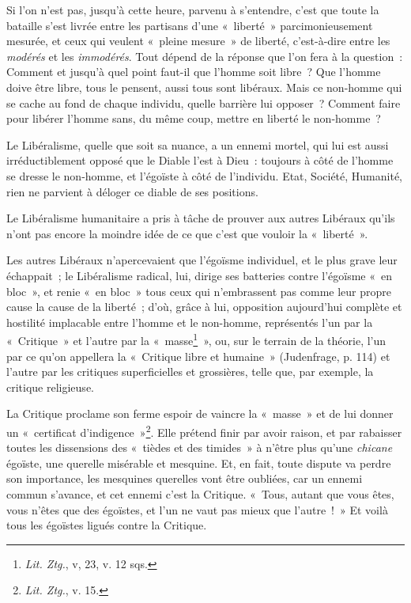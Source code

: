 \documentclass[french,twoside]{book} %
\begin{document}
\noindent Si l’on n’est pas, jusqu’à cette heure, parvenu à s’entendre, c’est que toute la bataille s’est livrée entre les partisans d’une « liberté » parcimonieusement mesurée, et ceux qui veulent « pleine mesure » de liberté, c’est-à-dire entre les \emph{modérés} et les \emph{immodérés}. Tout dépend de la réponse que l’on fera à la question : Comment et jusqu’à quel point faut-il que l’homme soit libre ? Que l’homme doive être libre, tous le pensent, aussi tous sont libéraux. Mais ce non-homme qui se cache au fond de chaque individu, quelle barrière lui opposer ? Comment faire pour libérer l’homme sans, du même coup, mettre en liberté le non-homme ?\par
Le Libéralisme, quelle que soit sa nuance, a un ennemi mortel, qui lui est aussi irréductiblement opposé que le Diable l’est à Dieu : toujours à côté de l’homme se dresse le non-homme, et l’égoïste à côté de l’individu. Etat, Société, Humanité, rien ne parvient à déloger ce diable de ses positions.\par
Le Libéralisme humanitaire a pris à tâche de prouver aux autres Libéraux qu’ils n’ont pas encore la moindre idée de ce que c’est que vouloir la « liberté ».\par
Les autres Libéraux n’apercevaient que l’égoïsme individuel, et le plus grave leur échappait ; le Libéralisme radical, lui, dirige ses batteries contre l’égoïsme « en bloc », et renie « en bloc » tous ceux qui n’embrassent pas comme leur propre cause la cause de la liberté ; d’où, grâce à lui, opposition aujourd’hui complète et hostilité implacable entre l’homme et le non-homme,  représentés l’un par la « Critique » et l’autre par la « masse\footnote{ \noindent \emph{Lit. Ztg.}, v, 23, v. 12 sqs.
 } », ou, sur le terrain de la théorie, l’un par ce qu’on appellera la « Critique libre et humaine » (Judenfrage, p. 114) et l’autre par les critiques superficielles et grossières, telle que, par exemple, la critique religieuse.\par
La Critique proclame son ferme espoir de vaincre la « masse » et de lui donner un « certificat d’indigence »\footnote{ \noindent \emph{Lit. Ztg.}, v. 15.
 }. Elle prétend finir par avoir raison, et par rabaisser toutes les dissensions des « tièdes et des timides » à n’être plus qu’une \emph{chicane} égoïste, une querelle misérable et mesquine. Et, en fait, toute dispute va perdre son importance, les mesquines querelles vont être oubliées, car un ennemi commun s’avance, et cet ennemi c’est la Critique. « Tous, autant que vous êtes, vous n’êtes que des égoïstes, et l’un ne vaut pas mieux que l’autre ! » Et voilà tous les égoïstes ligués contre la Critique.\par
\end{document}
